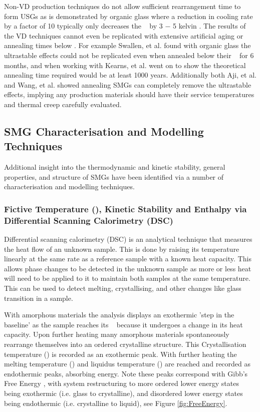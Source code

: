\documentclass[draft,a4paper,12pt,oneside]{report}%
\begin{document}
Non-VD production techniques do not allow sufficient rearrangement time to form USGs as is demonstrated by organic glass where a reduction in cooling rate by a factor of 10 typically only decreases the \Tg~ by 3 $-$ 5 kelvin \cite{Ediger1996, Dawson2011} . The results of the VD techniques cannot even be replicated with extensive artificial aging or annealing times below \Tg. For example Swallen, et al. \cite{Swallen2007} found with organic  glass the ultrastable effects could not be replicated even when annealed below their  \Tg~ for 6 months, and when working with Kearns, et al. \cite{Kearns2008} went on to show the theoretical annealing time required would be at least 1000 years. Additionally both Aji, et al. \cite{Aji2013} and Wang, et al. \cite{Wang2014} showed annealing SMGs can completely remove the ultrastable effects, implying any production materials should have their service temperatures and thermal creep carefully evaluated.

\subsection{SMG Characterisation and Modelling Techniques}
Additional insight into the thermodynamic and kinetic stability, general properties, and structure of SMGs have been identified via a number of characterisation and modelling techniques. 

\subsubsection{Fictive Temperature (\Tf), Kinetic Stability and Enthalpy via Differential Scanning Calorimetry (DSC)}
Differential scanning calorimetry (DSC) is an analytical technique that measures the heat flow of an unknown sample. This is done by raising its temperature linearly at the same rate as a reference sample with a known heat capacity. This allows phase changes to be detected in the unknown sample as more or less heat will need to be applied to it to maintain both samples at the same temperature. This can be used to detect melting, crystallising, and other changes like glass transition in a sample.

With amorphous materials the analysis displays an exothermic 'step in the baseline' as the sample reaches its \Tg~ because it undergoes a change in its heat capacity. Upon further heating many amorphous materials spontaneously rearrange themselves into an ordered crystalline structure. This Crystallisation temperature  (\Tx) is recorded as an exothermic peak. With further heating the melting temperature (\Tm) and liquidus temperature (\Tl) are reached and recorded as endothermic  peaks, absorbing energy. Note these peaks correspond with Gibb's Free Energy , with system restructuring to more ordered lower energy states being exothermic (i.e. glass to crystalline), and disordered lower energy states being endothermic (i.e. crystalline to liquid), see Figure \ref{fig:FreeEnergy}.
\end{document}
